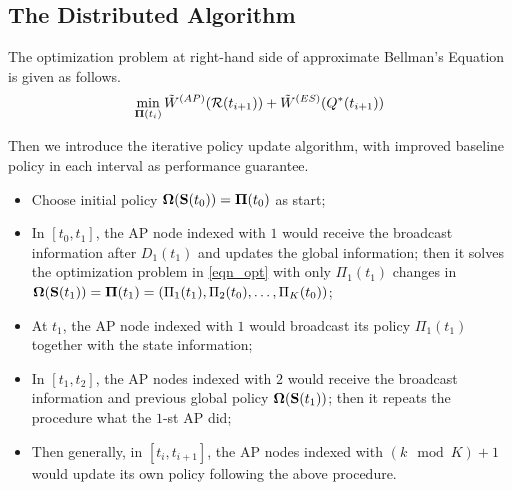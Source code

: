 \subsection{The Distributed Algorithm}

The optimization problem at right-hand side of approximate Bellman's Equation is given as follows.
\begin{align}
    \min_{\boldsymbol{\Pi}(t_i)} \tilde{W}^{(AP)}(\mathcal{R}(t_{i+1})) + \tilde{W}^{(ES)}(Q^*(t_{i+1}))
    \label{eqn_opt}
\end{align}

Then we introduce the iterative policy update algorithm, with improved baseline policy in each interval as performance guarantee.
\begin{itemize}
    \item Choose initial policy $\boldsymbol{\Omega}(\mathbf{S}(t_0)) = \boldsymbol{\Pi}(t_0)$ as start;
    \item In $[t_0, t_1]$, the AP node indexed with $1$ would receive the broadcast information after $D_1(t_1)$ and updates the global information; then it solves the optimization problem in \ref{eqn_opt} with only $\Pi_{1}(t_1)$ changes in $\boldsymbol{\Omega}(\mathbf{S}(t_1)) = \boldsymbol{\Pi}(t_1) = (\Pi_{1}(t_1), \Pi_{2}(t_0), \dots, \Pi_{K}(t_0))$;
    \item At $t_1$, the AP node indexed with $1$ would broadcast its policy $\Pi_{1}(t_1)$ together with the state information;
    \item In $[t_1, t_2]$, the AP nodes indexed with $2$ would receive the broadcast information and previous global policy $\boldsymbol{\Omega}(\mathbf{S}(t_1))$; then it repeats the procedure what the $1$-st AP did;
    \item Then generally, in $[t_{i}, t_{i+1}]$, the AP nodes indexed with $(k \mod K)+1$ would update its own policy following the above procedure.
\end{itemize}

